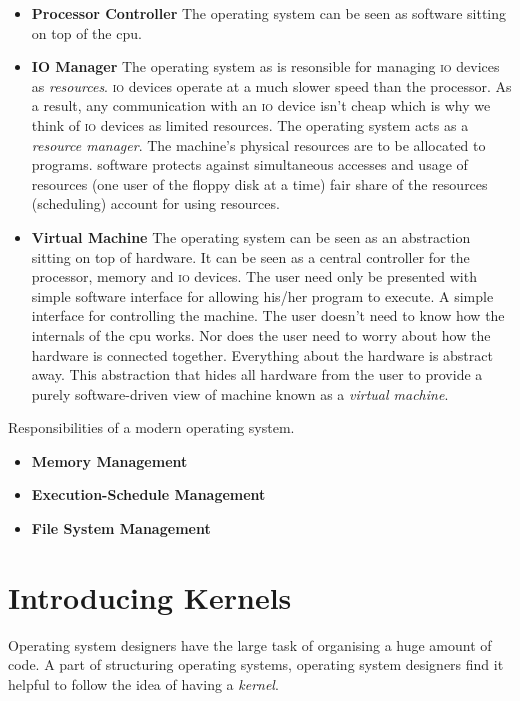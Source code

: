 \begin{itemize}   
\renewcommand{\labelitemi}{$\Box$}
\item \textbf{Processor Controller} 
The operating system can be seen as software sitting on top of the cpu.
\item \textbf{IO Manager}
The operating system as is resonsible for managing \textsc{io} 
devices as \textit{resources}. \textsc{io} devices operate at a
much slower speed than the processor. As a result, 
any communication with an \textsc{io} device isn't cheap which is why we think of 
\textsc{io} devices as limited resources.
The operating system acts as a \textit{resource manager}. 
The machine's physical resources are to be allocated to programs. 
software protects against simultaneous accesses
and usage of resources (one user of the ﬂoppy disk at a time)
fair share of the resources (scheduling) account for using resources.
\item \textbf{Virtual Machine} 
The operating system can be seen as an abstraction sitting on top of hardware. 
It can be seen as a central controller for the processor, memory and \textsc{io} devices.
The user need only be presented with simple software interface for 
allowing his/her program to execute. A simple interface for controlling the machine.
The user doesn't need to know how the internals of the cpu works. 
Nor does the user need to worry about how the hardware is connected together. 
Everything about the hardware is abstract away. 
This abstraction that hides all hardware from the user to provide a 
purely software-driven view of machine known as a \textit{virtual machine}.
\end{itemize}

Responsibilities of a modern operating system.
\begin{itemize}   
\renewcommand{\labelitemi}{$\Box$}
\item \textbf{Memory Management} %
\item \textbf{Execution-Schedule Management} 
\item \textbf{File System Management} 
\end{itemize}



\section{Introducing Kernels}

Operating system designers have the large task of 
organising a huge amount of code. 
A part of structuring operating systems,
operating system designers find it helpful to follow the idea of having a \textit{kernel}.

